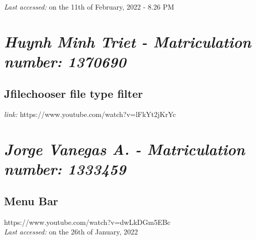 \emph{Last accessed:} on the 11th of February, 2022 - 8.26 PM

\section{\emph{Huynh Minh Triet - Matriculation number: 1370690}}

\subsection{Jfilechooser file type filter}

\emph{link:} https://www.youtube.com/watch?v=lFkYt2jKrYc \newline


\section{\emph{Jorge Vanegas A. - Matriculation number: 1333459}}
\subsection{Menu Bar}
https://www.youtube.com/watch?v=dwLkDGm5EBc \\
\emph{Last accessed:} on the 26th of January, 2022
